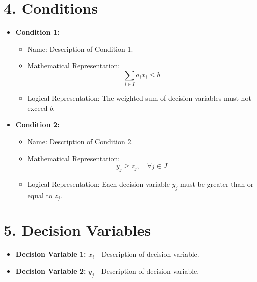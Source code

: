 \documentclass{article}
\begin{document}
\section{4. Conditions}
\begin{itemize}
    \item \textbf{Condition 1:}
        \begin{itemize}
            \item Name: Description of Condition 1.
            \item Mathematical Representation:
                \[
                    \sum_{i \in I} a_i x_i \leq b
                \]
            \item Logical Representation: The weighted sum of decision variables must not exceed \( b \).
        \end{itemize}

    \item \textbf{Condition 2:}
        \begin{itemize}
            \item Name: Description of Condition 2.
            \item Mathematical Representation:
                \[
                    y_j \geq z_j, \quad \forall j \in J
                \]
            \item Logical Representation: Each decision variable \( y_j \) must be greater than or equal to \( z_j \).
        \end{itemize}
\end{itemize}

\section{5. Decision Variables}
\begin{itemize}
    \item \textbf{Decision Variable 1:} \( x_i \) - Description of decision variable.
    \item \textbf{Decision Variable 2:} \( y_j \) - Description of decision variable.
\end{itemize}
\end{document}
